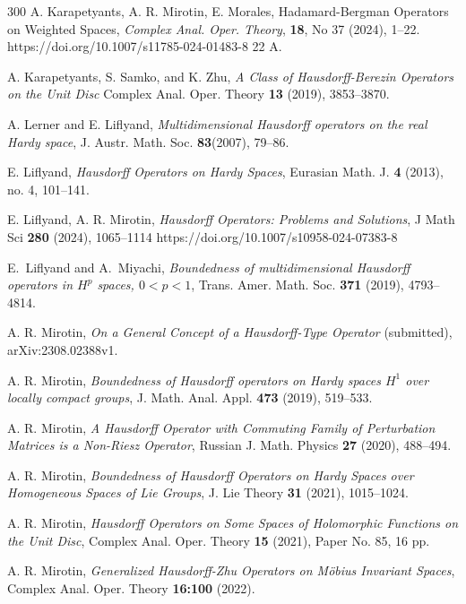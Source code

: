 \documentclass[12pt,reqno]{amsart}
\begin{document}
\begin{thebibliography}{300}
 A.  Karapetyants,  A. R. Mirotin,  E. Morales,
Hadamard-Bergman Operators on Weighted Spaces, {\it  Complex Anal. Oper. Theory}, {\bf 18}, No 37 (2024), 1--22. https://doi.org/10.1007/s11785-024-01483-8	22	A. 


 A. Karapetyants, S. Samko, and K.  Zhu, {\it  A Class of Hausdorff-Berezin Operators on the Unit Disc} Complex Anal. Oper. Theory {\bf13} (2019), 3853--3870.




 A. Lerner and E. Liflyand, {\it Multidimensional Hausdorff operators on the real Hardy space}, J. Austr. Math. Soc. {\bf 83}(2007), 79--86.



 E. Liflyand, {\it Hausdorff Operators on Hardy Spaces}, Eurasian Math. J. {\bf 4} (2013), no. 4, 101--141.

 E. Liflyand, A. R. Mirotin,
  {\it Hausdorff Operators: Problems and Solutions},  J Math Sci {\bf 280}  (2024), 1065--1114   https://doi.org/10.1007/s10958-024-07383-8
  
  E.\ Liflyand and A.\ Miyachi, {\it Boundedness of multidimensional Hausdorff operators in $H^p$ spaces, $0<p<1$}, Trans. Amer. Math. Soc. {\bf 371} (2019), 4793--4814. 


 A. R. Mirotin, {\it On a General Concept of a Hausdorff-Type Operator} (submitted), arXiv:2308.02388v1.

 A. R. Mirotin, {\it  Boundedness of Hausdorff operators on Hardy spaces $H^1$ over locally compact groups},  J. Math. Anal. Appl. {\bf 473} (2019), 519--533.



  A. R. Mirotin, {\it A Hausdorff Operator with Commuting Family of Perturbation Matrices is a Non-Riesz Operator}, Russian J. Math. Physics {\bf 27} (2020), 488--494.



 A. R. Mirotin, {\it Boundedness of Hausdorff Operators on Hardy Spaces over Homogeneous Spaces of Lie Groups}, J. Lie Theory {\bf 31} (2021), 1015--1024.

   A. R. Mirotin,   {\it  Hausdorff Operators on Some Spaces of Holomorphic Functions on the Unit Disc}, Complex Anal. Oper. Theory {\bf 15} (2021), Paper No. 85, 16 pp.

  A. R. Mirotin,   {\it Generalized Hausdorff-Zhu Operators on M\"{o}bius Invariant Spaces}, Complex Anal. Oper. Theory  {\bf 16:100} (2022). %


\end{thebibliography}
\end{document}
